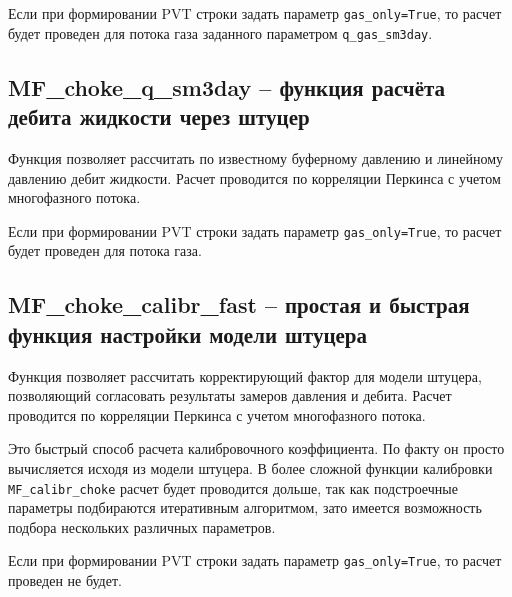 Если при формировании PVT строки задать параметр \texttt{gas_only=True}, то расчет будет проведен для потока газа заданного параметром \texttt{q_gas_sm3day}.



\subsection{MF\_choke\_q\_sm3day – функция расчёта дебита жидкости через штуцер}
Функция позволяет рассчитать по известному буферному давлению и линейному давлению дебит жидкости. Расчет  проводится по корреляции Перкинса \cite{Perkins_1993} с учетом многофазного потока.  


Если при формировании PVT строки задать параметр \texttt{gas_only=True}, то расчет будет проведен для потока газа.

\subsection{MF\_choke\_calibr\_fast – простая и быстрая функция настройки модели штуцера}
Функция позволяет рассчитать корректирующий фактор для модели штуцера, позволяющий согласовать результаты замеров давления и дебита. Расчет проводится по корреляции Перкинса \cite{Perkins_1993} с учетом многофазного потока.  

Это быстрый способ расчета калибровочного коэффициента. По факту он просто вычисляется исходя из модели штуцера.
В более сложной функции калибровки \texttt{MF_calibr_choke} расчет будет проводится дольше, так как подстроечные параметры подбираются итеративным алгоритмом, зато имеется возможность подбора нескольких различных параметров.


Если при формировании PVT строки задать параметр \texttt{gas_only=True}, то расчет проведен не будет.


